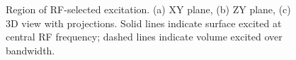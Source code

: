 \documentclass[journal]{IEEEtran}
\begin{document}
\begin{figure}[t]
\begin{center}
\end{center}
\caption{Region of RF-selected excitation. (a) XY plane, (b) ZY plane, (c) 3D view with projections. Solid lines indicate surface excited at central RF frequency; dashed lines indicate volume excited over bandwidth.}
\label{fig:fiducial-in-field}
\vspace{-10pt}
\end{figure}
\end{document}
